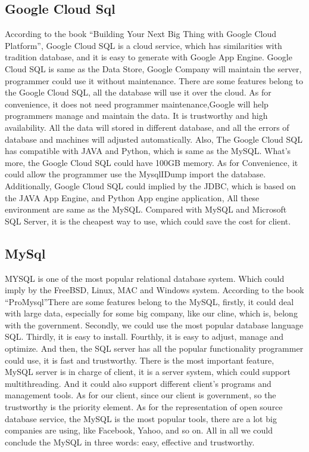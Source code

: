 \documentclass[letterpaper,10pt, draftclsnofoot,onecolumn]{IEEEtran}
\begin{document}
{{{{{\subsection[Google Cloud Sql]{\color{black}
Google Cloud Sql}
{\color{black}\normalsize\noindent
{According to the book “Building Your Next Big Thing with Google Cloud Platform”\cite{IEEEexample:book3}, Google Cloud SQL is a cloud service, which has similarities with tradition database, and it is easy to generate with Google App Engine. 
Google Cloud SQL is same as the Data Store, Google Company will maintain the server, programmer could use it without maintenance. 
There are some features belong to the Google Cloud SQL, all the database will use it over the cloud. 
As for convenience, it does not need programmer maintenance,Google will help programmers manage and maintain the data.
It is trustworthy and high availability. All the data will stored in different database, and all the errors of database and machines will adjusted automatically. 
Also, The Google Cloud SQL has compatible with JAVA and Python, which is same as the MySQL.
What’s more, the Google Cloud SQL could have 100GB memory. As for Convenience, it could allow the programmer use the MysqlIDump import the database. 
 Additionally, Google Cloud SQL could implied by the JDBC, which is based on the JAVA App Engine, and Python App engine application, All these environment are same as the MySQL.
 Compared with MySQL and Microsoft SQL Server, it is the cheapest way to use, which could save the cost for client.
}

\subsection[MySql]{\color{black}
MySql}
{\color{black}\normalsize\noindent
{MYSQL is one of the most popular relational database system. Which could imply by the FreeBSD, Linux, MAC and Windows system. 
According to the book “ProMysql”\cite{IEEEexample:book4}There are some features belong to the MySQL, firstly, it could deal with large data, especially for some big company, like our cline, which is, belong with the government. 
Secondly, we could use the most popular database language SQL. Thirdly, it is easy to install. Fourthly, it is easy to adjust, manage and optimize. 
And then, the SQL server has all the popular functionality programmer could use, it is fast and trustworthy. There is the most important feature, MySQL server is in charge of client, it is a server system, which could support multithreading. 
And it could also support different client’s programs and management tools. As for our client, since our client is government, so the trustworthy is the priority element.
As for the representation of open source database service, the MySQL is the most popular tools, there are a lot big companies are using, like Facebook, Yahoo, and so on. All in all we could conclude the MySQL in three words: easy, effective and trustworthy. 
}

}}}}}}}
\end{document}
